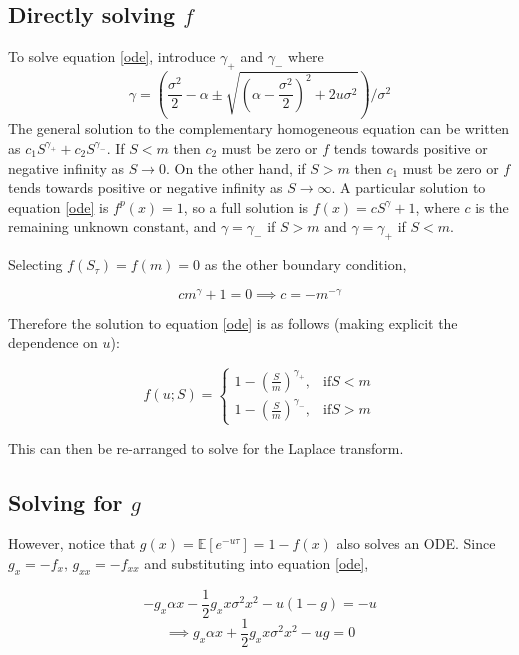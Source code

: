 \documentclass[12pt]{article}
\begin{document}
\subsection{Directly solving \(f\)}

To solve equation \ref{ode}, introduce \(\gamma_+\) and \(\gamma_{-}\) where \[\gamma =  \left(\frac{\sigma^2}{2}-\alpha  \pm \sqrt{\left(\alpha -\frac{\sigma^2}{2}\right)^2+2u\sigma^2}\right)/\sigma^2\]
The general solution to the complementary homogeneous equation can be written as \(c_1 S ^ {\gamma_+}+c_2 S^{\gamma_{-}}\).   If \(S<m\) then \(c_2\) must be zero or \(f\) tends towards positive or negative infinity as \(S \to 0\).  On the other hand, if \(S>m\) then \(c_1\) must be zero or \(f\) tends towards positive or negative infinity as \(S \to \infty\). A particular solution to equation \ref{ode} is \(f^p(x)=1\), so a full solution is \(f(x)=c S ^ \gamma +1\), where \(c\) is the remaining unknown constant, and \(\gamma = \gamma_{-}\) if \(S>m\) and \(\gamma= \gamma_{+}\) if \(S<m\).

Selecting \(f(S_\tau)=f(m)=0\) as the other boundary condition,

\[c m^{\gamma}+1=0 \implies c = -m^{-\gamma}\]

Therefore the solution to equation \ref{ode} is as follows (making explicit the dependence on \(u\)):

\begin{equation}
f(u; S)=\left\{
\begin{array}{rl}
1-\left(\frac{S}{m} \right) ^ {\gamma_{+}} , & \mathrm{if}  S<m \\
1-\left(\frac{S}{m} \right) ^ {\gamma_{-}}, & \mathrm{if} S>m
\end{array}
\right.
\end{equation}

This can then be re-arranged to solve for the Laplace transform.

\subsection{Solving for \(g\)}\label{homogenous}

However, notice that \(g(x)=\mathbb{E}\left[e^{-u\tau}\right]=1-f(x)\) also solves an ODE.  Since \(g_x=-f_x,\,g_{xx}=-f_{xx}\) and substituting into equation \ref{ode}, 

\[-g_x\alpha x -\frac{1}{2} g_xx \sigma^2 x^2-u(1-g)=-u\]
\[\implies g_x \alpha x + \frac{1}{2} g_xx \sigma^2 x^2-ug=0\]
\end{document}
